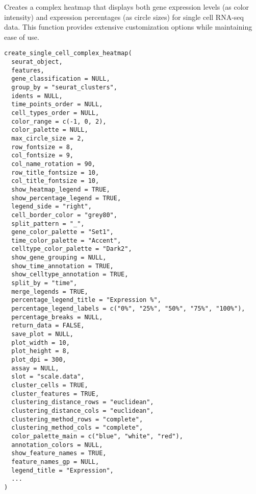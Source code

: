 \documentclass[a4paper]{book}
\begin{document}
%
\begin{Description}
Creates a complex heatmap that displays both gene expression levels (as color intensity) 
and expression percentages (as circle sizes) for single cell RNA-seq data.
This function provides extensive customization options while maintaining ease of use.
\end{Description}
%
\begin{Usage}
\begin{verbatim}
create_single_cell_complex_heatmap(
  seurat_object,
  features,
  gene_classification = NULL,
  group_by = "seurat_clusters",
  idents = NULL,
  time_points_order = NULL,
  cell_types_order = NULL,
  color_range = c(-1, 0, 2),
  color_palette = NULL,
  max_circle_size = 2,
  row_fontsize = 8,
  col_fontsize = 9,
  col_name_rotation = 90,
  row_title_fontsize = 10,
  col_title_fontsize = 10,
  show_heatmap_legend = TRUE,
  show_percentage_legend = TRUE,
  legend_side = "right",
  cell_border_color = "grey80",
  split_pattern = "_",
  gene_color_palette = "Set1",
  time_color_palette = "Accent",
  celltype_color_palette = "Dark2",
  show_gene_grouping = NULL,
  show_time_annotation = TRUE,
  show_celltype_annotation = TRUE,
  split_by = "time",
  merge_legends = TRUE,
  percentage_legend_title = "Expression %",
  percentage_legend_labels = c("0%", "25%", "50%", "75%", "100%"),
  percentage_breaks = NULL,
  return_data = FALSE,
  save_plot = NULL,
  plot_width = 10,
  plot_height = 8,
  plot_dpi = 300,
  assay = NULL,
  slot = "scale.data",
  cluster_cells = TRUE,
  cluster_features = TRUE,
  clustering_distance_rows = "euclidean",
  clustering_distance_cols = "euclidean",
  clustering_method_rows = "complete",
  clustering_method_cols = "complete",
  color_palette_main = c("blue", "white", "red"),
  annotation_colors = NULL,
  show_feature_names = TRUE,
  feature_names_gp = NULL,
  legend_title = "Expression",
  ...
)
\end{verbatim}
\end{Usage}
%
\end{document}
